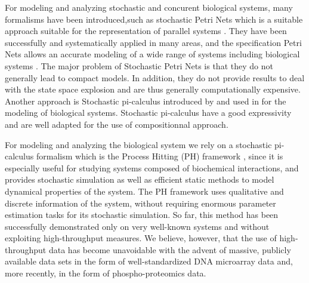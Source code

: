


For modeling and analyzing stochastic and concurent biological systems, many formalisms have been introduced,such as 
stochastic Petri Nets which is a suitable approach suitable for the representation of parallel systems \cite{molloy1982performance}. 
They have been successfully and systematically applied in many areas, and the specification Petri Nets
allows an accurate modeling of a wide range of systems including biological systems \cite{heiner2008petri}. The major 
problem of Stochastic Petri Nets is that they do not generally lead to compact models. In addition,
they do not provide results to deal with the state space explosion and are thus generally computationally
expensive. Another approach is Stochastic pi-calculus introduced by \cite{priami1995stochastic} and used in 
\cite{maurin2009modeling} for the modeling of biological systems. Stochastic pi-calculus have a good
expressivity and are well adapted for the use of compositionnal approach.

For modeling and analyzing the biological system we rely on a stochastic pi-calculus formalism which is the Process Hitting (PH) framework \cite{PMR10-TCSB}, 
since it is especially useful for studying systems composed of biochemical interactions, and provides
stochastic simulation as well as efficient static methods to model dynamical properties of the system.
The PH framework uses qualitative and discrete information of the system, without requiring enormous parameter estimation tasks
 for its stochastic simulation. 
So far, this method has been successfully demonstrated only on very well-known systems and without exploiting 
high-throughput measures. We believe, however, that the use of high-throughput data has become unavoidable with 
the advent of massive, publicly available data sets in the form of well-standardized DNA microarray data and, 
more recently, in the form of phospho-proteomics data.  




